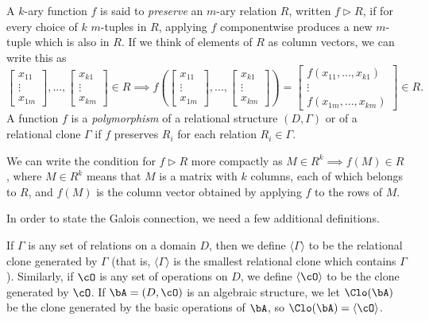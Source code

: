 \begin{defn} A $k$-ary function $f$ is said to \emph{preserve} an $m$-ary relation $R$, written $f \rhd R$, if for every choice of $k$ $m$-tuples in $R$, applying $f$ componentwise produces a new $m$-tuple which is also in $R$. If we think of elements of $R$ as column vectors, we can write this as
\[
\begin{bmatrix} x_{11}\\ \vdots\\ x_{1m} \end{bmatrix}, ..., \begin{bmatrix} x_{k1}\\ \vdots\\ x_{km} \end{bmatrix} \in R \implies f\left( \begin{bmatrix} x_{11}\\ \vdots\\ x_{1m} \end{bmatrix}, ..., \begin{bmatrix} x_{k1}\\ \vdots\\ x_{km} \end{bmatrix}\right) = \begin{bmatrix} f(x_{11}, ..., x_{k1})\\ \vdots\\ f(x_{1m}, ..., x_{km}) \end{bmatrix} \in R.
\]
A function $f$ is a \emph{polymorphism} of a relational structure $(D, \Gamma)$ or of a relational clone $\Gamma$ if $f$ preserves $R_i$ for each relation $R_i \in \Gamma$.
\end{defn}

We can write the condition for $f \rhd R$ more compactly as $M \in R^k \implies f(M) \in R$, where $M \in R^k$ means that $M$ is a matrix with $k$ columns, each of which belongs to $R$, and $f(M)$ is the column vector obtained by applying $f$ to the rows of $M$.

In order to state the Galois connection, we need a few additional definitions.

\begin{defn} If $\Gamma$ is any set of relations on a domain $D$, then we define $\langle \Gamma \rangle$ to be the relational clone generated by $\Gamma$ (that is, $\langle \Gamma \rangle$ is the smallest relational clone which contains $\Gamma$). Similarly, if $\cO$ is any set of operations on $D$, we define $\langle \cO \rangle$ to be the clone generated by $\cO$. If $\bA = (D, \cO)$ is an algebraic structure, we let $\Clo(\bA)$ be the clone generated by the basic operations of $\bA$, so $\Clo(\bA) = \langle \cO\rangle$.
\end{defn}

